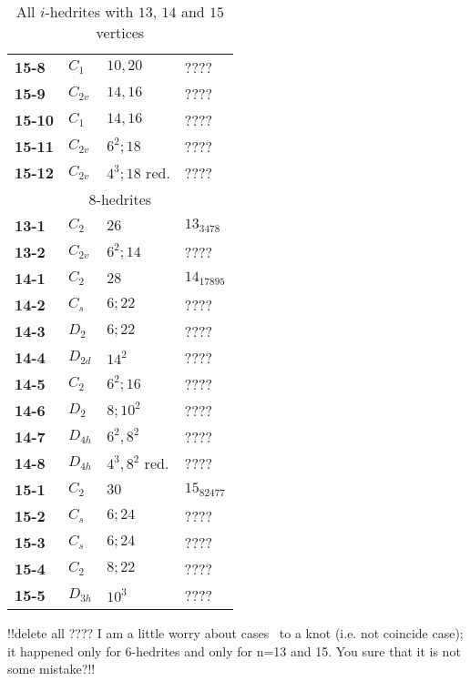 \documentclass[12pt]{article}
\begin{document}
\begin{table}
\begin{center}
{\begin{minipage}[t]{7cm}
\begin{tabular}{||l|l|l|l||}
{\bf 15-8}      &$C_1$  &$10,20$        &????\\
{\bf 15-9}      &$C_{2v}$  &$14,16$ &????\\
{\bf 15-10}     &$C_1$  &$14,16$        &????\\
{\bf 15-11}     &$C_{2v}$       &$6^2; 18$      &????\\
{\bf 15-12}     &$C_{2v}$       &$4^3; 18$ red. &????\\\hline
\hline
\multicolumn{4}{||c||}{$8$-hedrites}\\\hline
{\bf 13-1}      &$C_2$  &$26$           &$13_{3478}$\\
{\bf 13-2}      &$C_{2v}$       &$6^2; 14$      &????\\\hline
{\bf 14-1}      &$C_2$  &$28$           &$14_{17895}$\\
{\bf 14-2}      &$C_s$  &$6; 22$                &????\\
{\bf 14-3}      &$D_2$  &$6; 22$                &????\\
{\bf 14-4}      &$D_{2d}$       &$14^2$         &????\\
{\bf 14-5}      &$C_2$  &$6^2; 16$      &????\\
{\bf 14-6}      &$D_2$  &$8; 10^2$      &????\\
{\bf 14-7}      &$D_{4h}$       &$6^2, 8^2$     &????\\
{\bf 14-8}      &$D_{4h}$       &$4^3, 8^2$ red.        &????\\\hline
{\bf 15-1}      &$C_2$  &$30$   &$15_{82477}$\\
{\bf 15-2}      &$C_s$  &$6; 24$        &????\\
{\bf 15-3}      &$C_s$  &$6;24$ &????\\
{\bf 15-4}      &$C_2$  &$8; 22$        &????\\
{\bf 15-5}      &$D_{3h}$       &$10^3$ &????\\\hline\hline
\end{tabular}
\end{minipage}
}
\end{center}
\caption{All $i$-hedrites with $13$, $14$ and $15$ vertices}
\label{tab:i-hedrite13_14}
\end{table}

!!delete all ????
I am a little worry about cases ~to a knot (i.e. not coincide case);
it happened only for 6-hedrites and only for n=13 and 15. You sure
that it is not some mistake?!!
\end{document}
